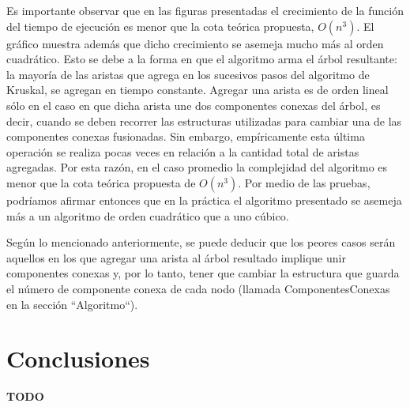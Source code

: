 \documentclass[a4paper,11pt] {article}
\begin{document}
Es importante observar que en las figuras presentadas el crecimiento de la funci\'on del tiempo de ejecuci\'on es menor que la cota te\'orica propuesta, $O(n^{3})$. El gr\'afico muestra adem\'as que dicho crecimiento se asemeja mucho m\'as al orden cuadr\'atico. Esto se debe a la forma en que el algoritmo arma el \'arbol resultante: la mayor\'ia de las aristas que agrega en los sucesivos pasos del algoritmo de Kruskal, se agregan en tiempo constante. Agregar una arista es de orden lineal s\'olo en el caso en que dicha arista une dos componentes conexas del \'arbol, es decir, cuando se deben recorrer las estructuras utilizadas para cambiar una de las componentes conexas fusionadas. Sin embargo, emp\'iricamente esta \'ultima operaci\'on  se realiza pocas veces en relaci\'on a la cantidad total de aristas agregadas. Por esta raz\'on, en el caso promedio la complejidad del algoritmo es menor que la cota te\'orica propuesta de $O(n^3)$. Por medio de las pruebas, podr\'iamos afirmar entonces que en la pr\'actica el algoritmo presentado se asemeja m\'as a un algoritmo de orden cuadr\'atico que a uno c\'ubico.

Seg\'un lo mencionado anteriormente, se puede deducir que los peores casos ser\'an aquellos en los que agregar una arista al \'arbol resultado implique unir componentes conexas y, por lo tanto, tener que cambiar la estructura que guarda el n\'umero de componente conexa de cada nodo (llamada ComponentesConexas en la secci\'on ``Algoritmo``).

\section*{Conclusiones}

\textbf{TODO}
\end{document}
